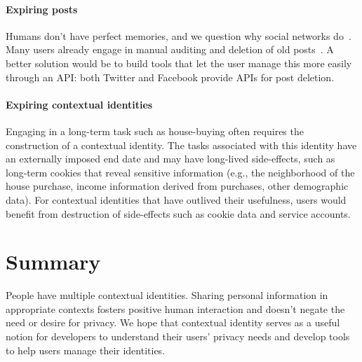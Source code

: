 \documentclass[10pt, conference, compsocconf]{IEEEtran}
\begin{document}
\paragraph{Expiring posts}
Humans don't have perfect memories, and we question why social networks
do~\cite{delete}. Many users already engage in manual auditing and
deletion of old posts~\cite{fbtips2}. A better solution would be to build tools
that let the user manage this more easily through an API: both Twitter and
Facebook provide APIs for post deletion.

\paragraph{Expiring contextual identities}
Engaging in a long-term task such as house-buying often requires the
construction of a contextual identity. The tasks associated with this identity
have an externally imposed end date and may have long-lived side-effects, such
as long-term cookies that reveal sensitive information (e.g., the neighborhood
of the house purchase, income information derived from purchases, other
demographic data). For contextual identities that have outlived their
usefulness, users would benefit from destruction of side-effects such as cookie
data and service accounts.

\section{Summary}
People have multiple contextual identities. Sharing personal information in
appropriate contexts fosters positive human interaction and doesn't negate the need or desire for privacy. We hope that
contextual identity serves as a useful notion for developers to understand
their users' privacy needs and develop tools to help users manage their
identities.

\begin{comment}
\section{Acknowledgements}
The authors thank
Lucas Adamski
Ben Adida
Mike Connor
Chris Karlof
\end{comment}



\end{document}
